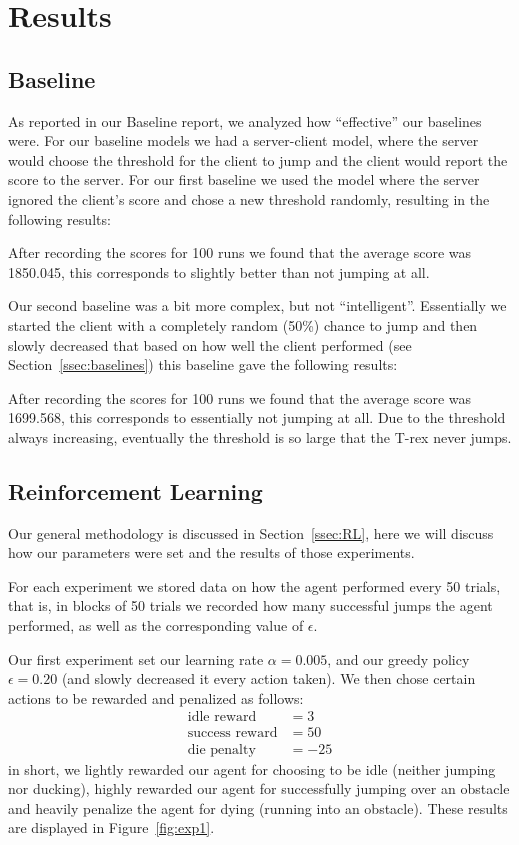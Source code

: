 \documentclass{scrartcl}
\begin{document}
\section{Results}

    \subsection{Baseline}
    As reported in our Baseline report, we analyzed how ``effective'' our
    baselines were. For our baseline models we had a server-client model, where
    the server would choose the threshold for the client to jump and the client
    would report the score to the server. For our first baseline we used the
    model where the server ignored the client's score and chose a new threshold
    randomly, resulting in the following results:

    After recording the scores for 100 runs we found that the average score was
    1850.045, this corresponds to slightly better than not jumping at all.

    Our second baseline was a bit more complex, but not ``intelligent''.
    Essentially we started the client with a completely random (50\%) chance to
    jump and then slowly decreased that based on how well the client performed
    (see Section~\ref{ssec:baselines}) this baseline gave the following results:

    After recording the scores for 100 runs we found that the average score was
    1699.568, this corresponds to essentially not jumping at all. Due to the
    threshold always increasing, eventually the threshold is so large that the
    T-rex never jumps.

    \subsection{Reinforcement Learning}

    Our general methodology is discussed in Section~\ref{ssec:RL}, here we will
    discuss how our parameters were set and the results of those experiments.

    For each experiment we stored data on how the agent performed every 50
    trials, that is, in blocks of 50 trials we recorded how many successful
    jumps the agent performed, as well as the corresponding value of 
    $\epsilon$.

    Our first experiment set our learning rate $\alpha = 0.005$, and our
    greedy policy $\epsilon = 0.20$ (and slowly decreased it every action
    taken). We then chose certain actions to be rewarded and penalized as
    follows:
    \begin{align*}
        \text{idle reward} &= 3\\
        \text{success reward} &= 50\\
        \text{die penalty} & = -25
    \end{align*}
    in short, we lightly rewarded our agent for choosing to be idle (neither 
    jumping nor ducking), highly rewarded our agent for successfully jumping 
    over an obstacle and heavily penalize the agent for dying (running into an
    obstacle). These results are displayed in Figure~\ref{fig:exp1}.
\end{document}
